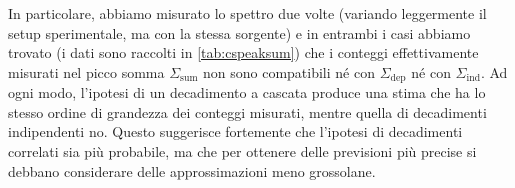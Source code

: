 In particolare, abbiamo misurato lo spettro due volte (variando leggermente il setup sperimentale, ma con la stessa sorgente) e in entrambi i casi abbiamo trovato (i dati sono raccolti in \cref{tab:cspeaksum}) che i conteggi effettivamente misurati nel picco somma $ \Sigma_\text{sum} $ non sono compatibili né con $ \Sigma_\text{dep} $ né con $ \Sigma_\text{ind} $.
Ad ogni modo, l'ipotesi di un decadimento a cascata produce una stima che ha lo stesso ordine di grandezza dei conteggi misurati, mentre quella di decadimenti indipendenti no.
Questo suggerisce fortemente che l'ipotesi di decadimenti correlati sia più probabile, ma che per ottenere delle previsioni più precise si debbano considerare delle approssimazioni meno grossolane.

